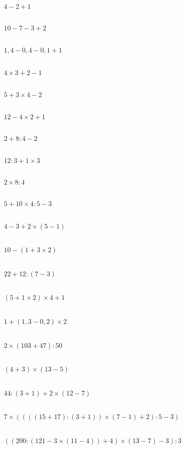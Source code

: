 \begin{multicols}{3}
    \\
    $4-2+1$

    \\
    $10-7-3+2$

    \\
    $1,4-0,4-0,1+1$
\end{multicols}

\begin{multicols}{3}
    \\
    $4\times 3+2-1$

    \\
    $5+3\times 4-2$

    \\
    $12-4\times 2+1$
\end{multicols}

\begin{multicols}{3}
    \\
    $2+8:4-2$

    \\
    $12:3+1\times 3$

    \\
    $2\times 8:4$
\end{multicols}

\begin{multicols}{3}
    \\
    $5+10\times 4:5-3$

    \\
    $4-3+2\times (5-1)$

    \\
    $10-(1+3\times 2)$
\end{multicols}

\begin{multicols}{3}
    \\
    $22+12:(7-3)$

    \\
    $(5+1\times 2)\times 4+1$

    \\
    $1+(1,3-0,2)\times 2$
\end{multicols}

\begin{multicols}{3}
    \\
    $2\times (103+47):50$

    \\
    $(4+3)\times (13-5)$

    \\
    $44:(3+1)+2\times (12-7)$
\end{multicols}

\begin{multicols}{2}
    \\
    $7\times ((((15+17):(3+1))\times (7-1)+2):5-3)$

    \\
    $((200:(121-3\times (11-4))+4)\times (13-7)-3):3$
\end{multicols}